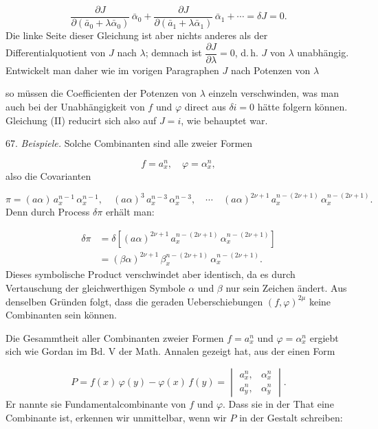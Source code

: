 \[
\frac{\partial J}{\partial(\bar a_0 + \lambda \bar \alpha_0)}\, \bar \alpha_0 + \frac{\partial J}{\partial(\bar a_1 + \lambda \bar \alpha_1)}\, \bar \alpha_1 + \cdots = \delta J = 0 .
\]
Die linke Seite dieser Gleichung ist aber nichts anderes als der Differentialquotient von $J$ nach $\lambda$; demnach ist $\dfrac{\partial J}{\partial \lambda} = 0$, d.\,h. $J$ von $\lambda$ unabhängig. Entwickelt man daher wie im vorigen Paragraphen $J$ nach Potenzen von $\lambda$

so müssen die Coefficienten der Potenzen von $\lambda$ einzeln verschwinden, was man auch bei der Unabhängigkeit von $f$ und $\varphi$ direct aus $\delta i = 0$ hätte folgern können. Gleichung (II) reducirt sich also auf $J = i$, wie behauptet war.

67. \textit{Beispiele.} Solche Combinanten sind alle  zweier Formen

\[
f = a_x^n, \quad \varphi = \alpha_x^n ,
\]
also die Covarianten

\[
\pi = (a\alpha)\, a_x^{n-1}\, \alpha_x^{n-1}, \quad (a\alpha)^3\, a_x^{n-3}\, \alpha_x^{n-3}, \quad \cdots \quad (a\alpha)^{2\nu+1}\, a_x^{n-(2\nu+1)}\, \alpha_x^{n-(2\nu+1)} .
\]
Denn durch Process $\delta \pi$ erhält man:

\[
\begin{aligned}
\delta \pi &= \delta\!\left[(a\alpha)^{2\nu+1}\, a_x^{n-(2\nu+1)}\, \alpha_x^{n-(2\nu+1)}\right]\\
&= (\beta\alpha)^{2\nu+1}\, \beta_x^{n-(2\nu+1)}\, \alpha_x^{n-(2\nu+1)} .
\end{aligned}
\]
Dieses symbolische Product verschwindet aber identisch, da es durch Vertauschung der gleichwerthigen Symbole $\alpha$ und $\beta$ nur sein Zeichen ändert. Aus denselben Gründen folgt, dass die geraden Ueberschiebungen $(f, \varphi)^{2\mu}$ keine Combinanten sein können.

Die Gesammtheit aller Combinanten zweier Formen $f = a_x^n$ und $\varphi = \alpha_x^n$ ergiebt sich wie Gordan im Bd. V der Math. Annalen gezeigt hat, aus der einen Form

\[
P = f(x)\,\varphi(y) - \varphi(x)\,f(y) = \begin{vmatrix} a_x^n, & \alpha_x^n \\ a_y^n, & \alpha_y^n \end{vmatrix} .
\]
Er nannte sie \glqq{}Fundamentalcombinante\grqq{} von $f$ und $\varphi$. Dass sie in der That eine Combinante ist, erkennen wir unmittelbar, wenn wir $P$ in der Gestalt schreiben:


